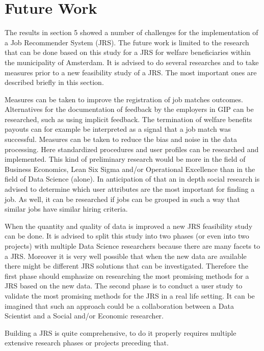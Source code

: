 \section{Future Work}
\label{sec:fut}

The results in section 5 showed a number of challenges for the implementation of a Job Recommender System (JRS).
The future work is limited to the research that can be done based on this study for a JRS for welfare beneficiaries within the municipality of Amsterdam.
It is advised to do several researches and to take measures prior to a new feasibility study of a JRS.
The most important ones are described briefly in this section.

Measures can be taken to improve the registration of job matches outcomes.
Alternatives for the documentation of feedback by the employers in GIP can be researched, such as using implicit feedback.
The termination of welfare benefits payouts can for example be interpreted as a signal that a job match was successful. 
Measures can be taken to reduce the bias and noise in the data processing.
Here standardized procedures and user profiles can be researched and implemented.
This kind of preliminary research would be more in the field of Business Economics, Lean Six Sigma and/or Operational Excellence than in the field of Data Science (alone).
In anticipation of that an in depth social research is advised to determine which user attributes are the most important for finding a job.
As well, it can be researched if jobs can be grouped in such a way that similar jobs have similar hiring criteria.

When the quantity and quality of data is improved a new JRS feasibility study can be done.
It is advised to split this study into two phases (or even into two  projects) with multiple Data Science researchers because there are many facets to a JRS. 
Moreover it is very well possible that when the new data are available there might be different JRS solutions that can be investigated.
Therefore the first phase should emphasize on researching the most promising methods for a JRS based on the new data.
The second phase is to conduct a user study to validate the most promising methods for the JRS in a real life setting.
It can be imagined that such an approach could be a collaboration between a Data Scientist and a Social and/or Economic researcher.  

Building a JRS is quite comprehensive, to do it properly requires multiple extensive research phases or projects preceding that.
